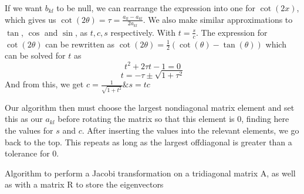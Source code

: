 \documentclass[10pt, twocolumn]{article}
\begin{document}
If we want $b_{kl}$ to be null, we can rearrange the expression into one for $\cot(2x)$\cite{rottmann2006matematisk}, 
which gives us $\cot(2\theta) = \tau = \frac{a_{ll} - a_{kl}}{2a_{kl}}$. We also make similar approximations to 
$\tan$, $\cos$ and $\sin$, as $t, c, s$ respectively. With $t = \frac{s}{c} $. The expression for $\cot(2\theta)$
can be rewritten as $\cot(2\theta) = \frac{1}{2}(\cot(\theta) - \tan(\theta))$ which can be solved for $t$ as 
\[ t^2 + 2\tau t - 1 = 0 \]
\[ t = - \tau \pm \sqrt{1 + \tau^2} \]
And from this, we get $c = \frac{1}{\sqrt{1 + t^2}} \& s = tc$

Our algorithm then must choose the largest nondiagonal matrix element and set this as our $a_{kl}$ before rotating the 
matrix so that this element is 0, finding here the values for $s$ and $c$. After inserting the values into the 
relevant elements, we go back to the top. This repeats as long as the largest offdiagonal is greater than a tolerance 
for 0.

\begin{algorithm}
    \caption{Algorithm to perform a Jacobi transformation on a tridiagonal matrix A, as well as with 
        a matrix R to store the eigenvectors}
\end{algorithm}
\end{document}
